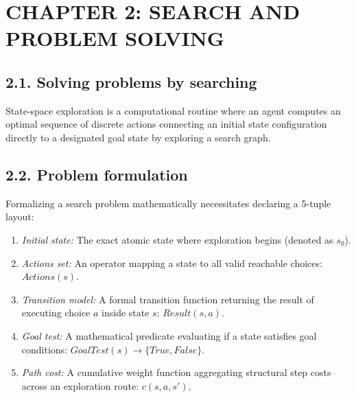 \documentclass[../main.tex]{subfiles}
\begin{document}

\section{CHAPTER 2: SEARCH AND PROBLEM SOLVING}

\subsection{2.1. Solving problems by searching}
State-space exploration is a computational routine where an agent computes an optimal sequence of discrete actions connecting an initial state configuration directly to a designated goal state by exploring a search graph.

\subsection{2.2. Problem formulation}
Formalizing a search problem mathematically necessitates declaring a 5-tuple layout:
\begin{enumerate}
    \item \textit{Initial state:} The exact atomic state where exploration begins (denoted as $s_0$).
    \item \textit{Actions set:} An operator mapping a state to all valid reachable choices: $Actions(s)$.
    \item \textit{Transition model:} A formal transition function returning the result of executing choice $a$ inside state $s$: $Result(s, a)$.
    \item \textit{Goal test:} A mathematical predicate evaluating if a state satisfies goal conditions: $GoalTest(s) \rightarrow \{True, False\}$.
    \item \textit{Path cost:} A cumulative weight function aggregating structural step costs across an exploration route: $c(s, a, s')$.
\end{enumerate}
\end{document}
